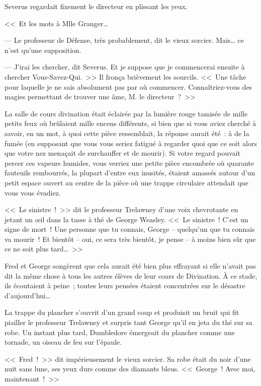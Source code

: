 Severus regardait fixement le directeur en plissant les yeux.

<<~Et les mots à Mlle Granger…

--- Le professeur de Défense, très probablement, dit le vieux sorcier. Mais… ce n'est qu'une supposition.

--- J'irai les chercher, dit Severus. Et je suppose que je commencerai ensuite à chercher Vous-Savez-Qui.~>> Il fronça brièvement les sourcils. <<~Une tâche pour laquelle je ne sais absolument pas par où commencer. Connaîtriez-vous des magies permettant de trouver une âme, M. le directeur~?~>>

\later

La salle de cours divination était éclairée par la lumière rouge tamisée de mille petits feux où brûlaient mille encens différents, si bien que si vous aviez cherché à savoir, en un mot, à quoi cette pièce ressemblait, la réponse aurait été~: à de la fumée (en supposant que vous vous seriez fatigué à regarder quoi que ce soit alors que votre nez menaçait de surchauffer et de mourir). Si votre regard pouvait percer ces vapeurs humides, vous verriez une petite pièce encombrée où quarante fauteuils rembourrés, la plupart d'entre eux inusités, étaient amassés autour d'un petit espace ouvert au centre de la pièce où une trappe circulaire attendait que vous vous évadiez.

<<~Le sinistre~!~>> dit le professeur Trelawney d'une voix chevrotante en jetant un œil dans la tasse à thé de George Weasley. <<~Le sinistre~! C'est un signe de mort~! Une personne que tu connais, George -- quelqu'un que tu connais va mourir~! Et bientôt -- oui, ce sera très bientôt, je pense -- à moins bien sûr que ce ne soit plus tard…~>>

Fred et George songèrent que cela aurait été bien plus effrayant si elle n'avait pas dit la même chose à tous les autres élèves de leur cours de Divination. À ce stade, ils écoutaient à peine~; toutes leurs pensées étaient concentrées sur le désastre d'aujourd'hui…

La trappe du plancher s'ouvrit d'un grand coup et produisit un bruit qui fit piailler le professeur Trelawney et surpris tant George qu'il en jeta du thé sur sa robe. Un instant plus tard, Dumbledore émergeait du plancher comme une tornade, un oiseau de feu sur l'épaule.

<<~Fred~!~>> dit impérieusement le vieux sorcier. Sa robe était du noir d'une nuit sans lune, ses yeux durs comme des diamants bleus. <<~George~! Avec moi, maintenant~!~>>

